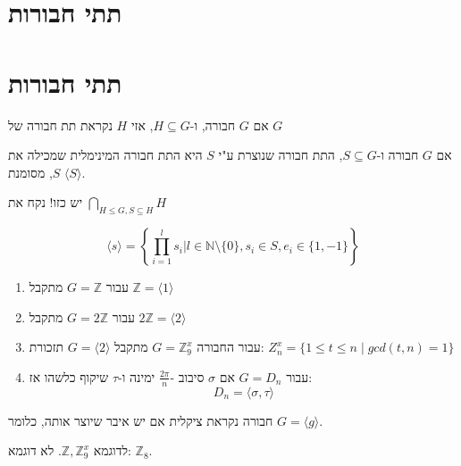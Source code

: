 \documentclass{tstextbook}
\begin{document}
\section{תתי חבורות}

\section{תתי חבורות}

\begin{definition}[תת חבורה]
אם \(G\) חבורה, ו-\(H\subseteq G\), אזי \(H\) נקראת תת חבורה של \(G\)

\end{definition}
\begin{definition}
אם \(G\) חבורה ו-\(S\subseteq G\), התת חבורה שנוצרת ע"י \(S\) היא התת חבורה המינימלית שמכילה את \(S\), מסומנת \(\langle S\rangle\).

\end{definition}
\begin{remark}
יש כזו! נקח את \(\bigcap_{{H\leq G,S\subseteq H}}H\)

\end{remark}
\begin{proposition}
$$\langle s\rangle=\left\{  \prod_{i=1}^{l}s_{i}\bigg| l\in\mathbb{N}\setminus \{ 0 \},s_{i}\in S,e_{i} \in \{ 1,-1 \}  \right\}$$

\end{proposition}
\begin{example}
  \begin{enumerate}
    \item עבור \(G=\mathbb{Z}\) מתקבל \(\mathbb{Z}=\langle 1\rangle\)


    \item עבור \(G=2\mathbb{Z}\) מתקבל \(2\mathbb{Z}=\langle 2\rangle\)


    \item עבור החבורה \(G=\mathbb{Z}_{9}^x\) מתקבל \(G=\langle 2\rangle\) 
תזכורת: \(Z_{n}^x=\{ 1\leq t\leq n \;\big|\;gcd(t,n)=1 \}\)


    \item עבור \(G=D_{n}\) אם \(\sigma\) סיבוב -\(\frac{2\pi}{n}\) ימינה ו-\(\tau\) שיקוף כלשהו אז: 
$$D_{n}=\langle \sigma,\tau\rangle $$


  \end{enumerate}
\end{example}
\begin{definition}
חבורה נקראת ציקלית אם יש איבר שיוצר אותה, כלומר \(G=\langle g\rangle\). 

\end{definition}
לדוגמא \(\mathbb{Z},\mathbb{Z}_{9}^x\).
לא דוגמא: \(\mathbb{Z}_{8}\).
\end{document}
